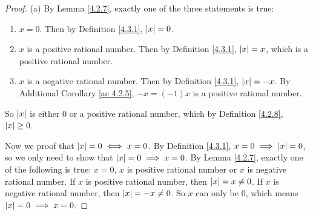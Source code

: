 \begin{proof}{(a)}
By Lemma \ref{4.2.7}, exactly one of the three statements is true:
\begin{enumerate}[label=(\roman*)]
    \item \(x = 0\).
    Then by Definition \ref{4.3.1}, \(\abs*{x} = 0\).
    \item \(x\) is a positive rational number.
    Then by Definition \ref{4.3.1}, \(\abs*{x} = x\), which is a positive rational number.
    \item \(x\) is a negative rational number.
    Then by Definition \ref{4.3.1}, \(\abs*{x} = -x\).
    By Additional Corollary \ref{ac 4.2.5}, \(-x = (-1)x\) is a positive rational number.
\end{enumerate}
So \(\abs*{x}\) is either \(0\) or a positive rational number, which by Definition \ref{4.2.8}, \(\abs*{x} \geq 0\).

Now we proof that \(\abs*{x} = 0 \iff x = 0\).
By Definition \ref{4.3.1}, \(x = 0 \implies \abs*{x} = 0\), so we only need to show that \(\abs*{x} = 0 \implies x = 0\).
By Lemma \ref{4.2.7}, exactly one of the following is true:
\(x = 0\), \(x\) is positive rational number or \(x\) is negative rational number.
If \(x\) is positive rational number, then \(\abs*{x} = x \neq 0\).
If \(x\) is negative rational number, then \(\abs*{x} = -x \neq 0\).
So \(x\) can only be \(0\), which means \(\abs*{x} = 0 \implies x = 0\).
\end{proof}

